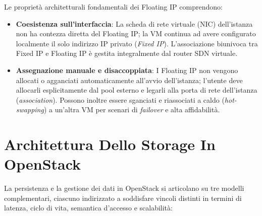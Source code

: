 \documentclass[11pt, a4paper]{article}
\begin{document}
Le proprietà architetturali fondamentali dei Floating IP comprendono:
\begin{itemize}[noitemsep]
    \item \textbf{Coesistenza sull'interfaccia}: La scheda di rete virtuale (NIC) dell'istanza non ha contezza diretta del Floating IP; la VM continua ad avere configurato localmente il solo indirizzo IP privato (\emph{Fixed IP}). L'associazione biunivoca tra Fixed IP e Floating IP è gestita integralmente dal router SDN virtuale.
    \item \textbf{Assegnazione manuale e disaccoppiata}: I Floating IP non vengono allocati o agganciati automaticamente all'avvio dell'istanza; l'utente deve allocarli esplicitamente dal pool esterno e legarli alla porta di rete dell'istanza (\emph{association}). Possono inoltre essere sganciati e riassociati a caldo (\emph{hot-swapping}) a un'altra VM per scenari di \emph{failover} e alta affidabilità.
\end{itemize}

\newpage

\section{Architettura Dello Storage In OpenStack}

La persistenza e la gestione dei dati in OpenStack si articolano su tre modelli complementari, ciascuno indirizzato a soddisfare vincoli distinti in termini di latenza, ciclo di vita, semantica d'accesso e scalabilità:
\end{document}
